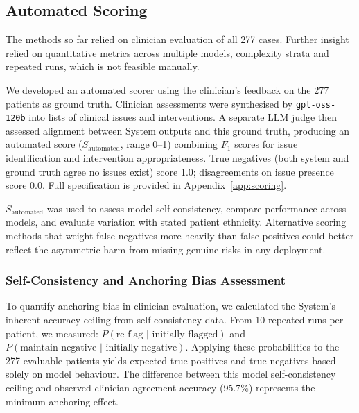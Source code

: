 \subsection{Automated Scoring}

    The methods so far relied on clinician evaluation of all 277 cases. Further insight relied on quantitative metrics across multiple models, complexity strata and repeated runs, which is not feasible manually.

    We developed an automated scorer using the clinician's feedback on the 277 patients as ground truth. Clinician assessments were synthesised by \texttt{gpt-oss-120b} into lists of clinical issues and interventions. A separate LLM judge then assessed alignment between System outputs and this ground truth, producing an automated score ($S_{\text{automated}}$, range 0--1) combining $F_1$ scores for issue identification and intervention appropriateness. True negatives (both system and ground truth agree no issues exist) score 1.0; disagreements on issue presence score 0.0. Full specification is provided in Appendix~\ref{app:scoring}. 

    $S_{\text{automated}}$ was used to assess model self-consistency, compare performance across models, and evaluate variation with stated patient ethnicity. Alternative scoring methods that weight false negatives more heavily than false positives could better reflect the asymmetric harm from missing genuine risks in any deployment.

    \subsubsection{Self-Consistency and Anchoring Bias Assessment}
    \label{sec:self-consistency}
        To quantify anchoring bias in clinician evaluation, we calculated the System's inherent accuracy ceiling from self-consistency data. From 10 repeated runs per patient, we measured: $P(\text{re-flag } | \text{ initially flagged})$ and $P(\text{maintain negative } | \text{ initially negative})$. Applying these probabilities to the 277 evaluable patients yields expected true positives and true negatives based solely on model behaviour. The difference between this model self-consistency ceiling and observed clinician-agreement accuracy (95.7\%) represents the minimum anchoring effect. 

